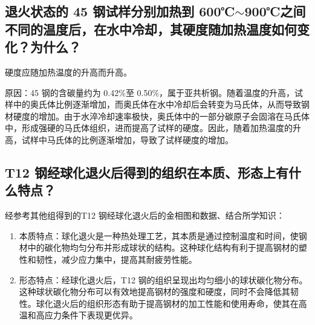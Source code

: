 \documentclass[a4paper,utf8]{article}
\begin{document}
    \subsection{退火状态的 45 钢试样分别加热到 600℃$\sim$900℃之间不同的温度后，在水中冷却，其硬度随加热温度如何变化？为什么？}
        硬度应随加热温度的升高而升高。\par
        原因：45 钢的含碳量约为 0.42\%至 0.50\%，属于亚共析钢。随着温度的升高，试样中的奥氏体比例逐渐增加，而奥氏体在水中冷却后会转变为马氏体，从而导致钢材硬度的增加。由于水淬冷却速率极快，奥氏体中的一部分碳原子会固溶在马氏体中，形成强硬的马氏体组织，进而提高了试样的硬度。因此，随着加热温度的升高，试样中马氏体的比例逐渐增加，导致了试样硬度的增加。
    \subsection{T12 钢经球化退火后得到的组织在本质、形态上有什么特点？}
        经参考其他组得到的T12 钢经球化退火后的金相图和数据、结合所学知识：
        \begin{enumerate}
            \item 本质特点：球化退火是一种热处理工艺，其本质是通过控制温度和时间，使钢材中的碳化物均匀分布并形成球状的结构。这种球化结构有利于提高钢材的塑性和韧性，减少应力集中，提高其耐疲劳性能。
            \item 形态特点：经球化退火后，T12 钢的组织呈现出均匀细小的球状碳化物分布。这种球状碳化物分布可以有效地提高钢材的强度和硬度，同时不会降低其韧性。球化退火后的组织形态有助于提高钢材的加工性能和使用寿命，使其在高温和高应力条件下表现更优异。
        \end{enumerate}
\end{document}
